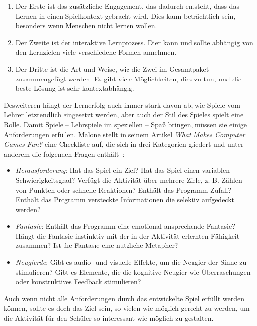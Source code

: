 \begin{enumerate}
    \item Der Erste ist das zusätzliche Engagement, das dadurch entsteht, dass das Lernen in einen Spielkontext gebracht wird. Dies kann beträchtlich sein, besonders wenn Menschen nicht lernen wollen.
    \item Der Zweite ist der interaktive Lernprozess. Dier kann und sollte abhängig von den Lernzielen viele verschiedene Formen annehmen.
    \item Der Dritte ist die Art und Weise, wie die Zwei im Gesamtpaket zusammengefügt werden. Es gibt viele Möglichkeiten, dies zu tun, und die beste Lösung ist sehr kontextabhängig.
\end{enumerate}

Desweiteren hängt der Lernerfolg auch immer stark davon ab, wie Spiele vom Lehrer letztendlich eingesetzt werden, aber auch der Stil des Spieles spielt eine Rolle. Damit Spiele -- Lehrspiele im speziellen -- Spaß bringen, müssen sie einige Anforderungen erfüllen. Malone stellt in seinem Artikel \textit{What Makes Computer Games Fun?} eine Checkliste auf, die sich in drei Kategorien gliedert und unter anderem die folgenden Fragen enthält~\cite[49]{malone1981}:

\begin{itemize}
    \item \emph{Herausforderung}: Hat das Spiel ein Ziel? Hat das Spiel einen variablen Schwierigkeitsgrad? Verfügt die Aktivität über mehrere Ziele, z. B. Zählen von Punkten oder schnelle Reaktionen? Enthält das Programm Zufall? Enthält das Programm versteckte Informationen die selektiv aufgedeckt werden?
    \item \emph{Fantasie}: Enthält das Programm eine emotional ansprechende Fantasie? Hängt die Fantasie instinktiv mit der in der Aktivität erlernten Fähigkeit zusammen? Ist die Fantasie eine nützliche Metapher?
    \item \emph{Neugierde}: Gibt es audio- und visuelle Effekte, um die Neugier der Sinne zu stimulieren? Gibt es Elemente, die die kognitive Neugier wie Überraschungen oder konstruktives Feedback stimulieren?
\end{itemize}

Auch wenn nicht alle Anforderungen durch das entwickelte Spiel erfüllt werden können, sollte es doch das Ziel sein, so vielen wie möglich gerecht zu werden, um die Aktivität für den Schüler so interessant wie möglich zu gestalten.


